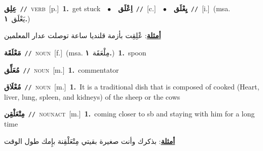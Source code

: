 \documentclass[10pt,a4paper,twoside]{article} %
\begin{document}
\begin{multicols}{2}
{\setlength\topsep{0pt}\textbf{\foreignlanguage{arabic}{عِلِق}}\ {\color{gray}\texttt{//}\color{black}}\ \textsc{verb}\ [p.]\ \textbf{1.}~get stuck\ \ $\bullet$\ \ \setlength\topsep{0pt}\textbf{\foreignlanguage{arabic}{اِعْلَق}}\ {\color{gray}\texttt{//}\color{black}}\ [c.]\ \ $\bullet$\ \ \setlength\topsep{0pt}\textbf{\foreignlanguage{arabic}{يِعْلَق}}\ {\color{gray}\texttt{//}\color{black}}\ [i.]\ \color{gray}(msa. \foreignlanguage{arabic}{يَعْلَق}~\foreignlanguage{arabic}{\textbf{١.}})\color{black}\  \begin{flushright}\color{gray}\foreignlanguage{arabic}{\textbf{\underline{\foreignlanguage{arabic}{أمثلة}}}: عْلِقِت بأزمة قلنديا ساعة توصلت عدار المعلمين}\end{flushright}\color{black}} \vspace{2mm}

{\setlength\topsep{0pt}\textbf{\foreignlanguage{arabic}{مَعْلَقَة}}\ {\color{gray}\texttt{//}\color{black}}\ \textsc{noun}\ [f.]\ \color{gray}(msa. \foreignlanguage{arabic}{مِلْعَقَة}~\foreignlanguage{arabic}{\textbf{١.}})\color{black}\ \textbf{1.}~spoon\ } \vspace{2mm}

{\setlength\topsep{0pt}\textbf{\foreignlanguage{arabic}{مُعَلِّق}}\ {\color{gray}\texttt{//}\color{black}}\ \textsc{noun}\ [m.]\ \textbf{1.}~commentator\ } \vspace{2mm}

{\setlength\topsep{0pt}\textbf{\foreignlanguage{arabic}{مُعْلَاق}}\ {\color{gray}\texttt{//}\color{black}}\ \textsc{noun}\ [m.]\ \textbf{1.}~It is a traditional dish that is composed of cooked (Heart, liver, lung, spleen, and kidneys) of the sheep or the cows\ } \vspace{2mm}

{\setlength\topsep{0pt}\textbf{\foreignlanguage{arabic}{مِتْعَلْقِن}}\ {\color{gray}\texttt{//}\color{black}}\ \textsc{noun\textunderscore act}\ [m.]\ \textbf{1.}~coming closer to sb and staying with him for a long time\  \begin{flushright}\color{gray}\foreignlanguage{arabic}{\textbf{\underline{\foreignlanguage{arabic}{أمثلة}}}: بذكرك وأنت صغيرة بقيتي مِتْعَلْقِنة بإِمك طول الوقت}\end{flushright}\color{black}} \vspace{2mm}


\end{multicols}
\end{document}
